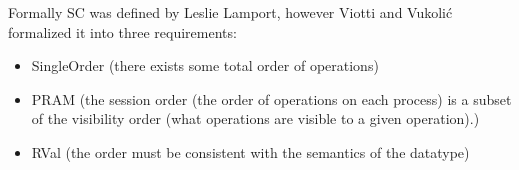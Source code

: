 \documentclass[a4paper,10pt,titlepage]{report}
\begin{document}
    Formally SC was defined by Leslie Lamport\cite{Lamport1979how}, however Viotti and Vukolić\cite{ConsistencyinNonTransactionalDistributedStorageSystems} formalized it into three requirements:
    \begin{itemize}
        \item SingleOrder (there exists some total order of operations)
        \item PRAM (the session order (the order of operations on each process) is a subset of the visibility order (what operations are visible to a given operation).)
        \item RVal (the order must be consistent with the semantics of the datatype)
    \end{itemize}






\end{document}
